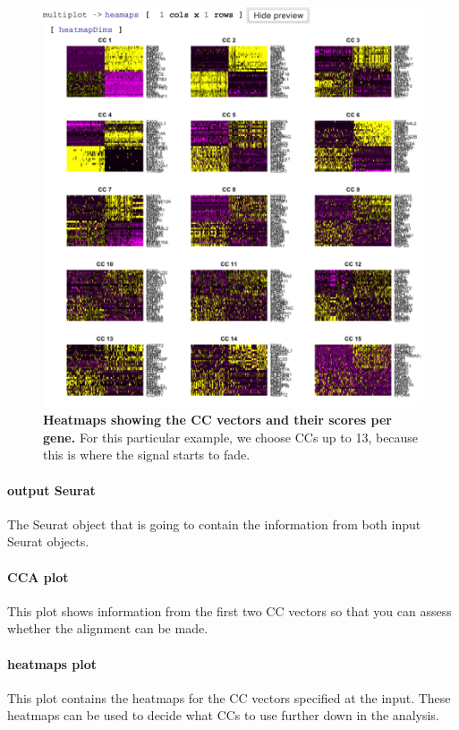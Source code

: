 \begin{figure}
  \centering
    \includegraphics[width=\figWidthNarrow]{figures/HeatmapCCs.pdf}
    \caption[Heatmaps showing the CC vectors and their scores per gene.]{\textbf{Heatmaps showing
    the CC vectors and their scores per gene.} For this particular example, we choose CCs
    up to 13, because this is where the signal starts to fade.}
\label{fig:HeatmapCCs}
\end{figure}

\paragraph{output Seurat} The Seurat object that is going to contain the information
from both input Seurat objects.

\paragraph{CCA plot} This plot shows information from the first two CC vectors so that
you can assess whether the alignment can be made.

\paragraph{heatmaps plot} This plot  contains the heatmaps for the CC vectors specified at
the input. These heatmaps can be used to decide what CCs to use further down in the analysis.

